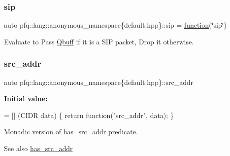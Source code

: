 \subsubsection{\texorpdfstring{sip}{sip}}
{\footnotesize\ttfamily auto pfq\+::lang\+::anonymous\+\_\+namespace\{default.\+hpp\}\+::sip = \hyperlink{namespacepfq_1_1lang_a1a4638059d700ae08d0ca63886ff2bb3}{function}(\char`\"{}sip\char`\"{})}



Evaluate to {\ttfamily Pass} \hyperlink{structpfq_1_1lang_1_1Qbuff}{Qbuff} if it is a S\+IP packet, {\ttfamily Drop} it otherwise. 

\mbox{\label{namespacepfq_1_1lang_1_1anonymous__namespace_02default_8hpp_03_a2ee09b5a65a64d60bc797b2ecd1c8a4a}} 
\subsubsection{\texorpdfstring{src\+\_\+addr}{src\_addr}}
{\footnotesize\ttfamily auto pfq\+::lang\+::anonymous\+\_\+namespace\{default.\+hpp\}\+::src\+\_\+addr}

{\bfseries Initial value\+:}
\begin{DoxyCode}
= [] (CIDR data)
        \{
            \textcolor{keywordflow}{return} \textcolor{keyword}{function}(\textcolor{stringliteral}{"src\_addr"}, data);
        \}
\end{DoxyCode}


Monadic version of {\ttfamily has\+\_\+src\+\_\+addr} predicate. 

\begin{DoxySeeAlso}{See also}
\hyperlink{namespacepfq_1_1lang_1_1anonymous__namespace_02default_8hpp_03_acb03dd3e34d6dd7e83d621fa9077194c}{has\+\_\+src\+\_\+addr} 
\end{DoxySeeAlso}
\mbox{\label{namespacepfq_1_1lang_1_1anonymous__namespace_02default_8hpp_03_ad1645151270994a4f396565b70233b73}} 
